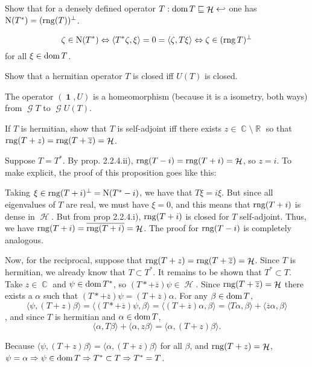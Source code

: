 \documentclass{article}
\theoremstyle{exercisestyle}
\newenvironment{exercise}[1]
  {\renewcommand\theinnerex{#1}\innerex}
  {\endinnerex}
\DeclareMathOperator{\Real}{\mathbb{R}}
\DeclareMathOperator{\Complex}{\mathbb{C}}
\DeclareMathOperator{\hilbert}{\mathcal{H}}
\DeclareMathOperator{\graph}{\mathcal{G}}
\DeclareMathOperator{\Id}{\textbf{1}}
\newcommand{\closure}[1]{\overline{ #1}}
\newcommand{\inner}[2]{\langle #1, #2 \rangle}
\newcommand{\conj}[1]{\overline{#1}}
\begin{document}
\begin{exercise}{2.2.2}
    Show that for a densely defined operator $T : \dom T \sqsubseteq \hilbert \hookleftarrow$ one has $\operatorname{N}(T^*) = (\operatorname{rng} (T))^\perp$.

    $$\zeta \in \kernel (T^*) \Leftrightarrow  \inner{T^* \zeta}{\xi} = 0 = \inner{\zeta}{T \xi} \Leftrightarrow \zeta \in (\rng T)^\perp$$ for all $\xi \in \operatorname{dom} T$.

\end{exercise}

\begin{exercise}{2.2.6}
    Show that a hermitian operator $T$ is closed iff $U (T )$ is closed.

    The operator $(\Id, U)$ is a homeomorphism (because it is a isometry, both ways) from $\graph T$ to $\graph U(T)$.

\end{exercise}

\begin{exercise}{2.2.7}
    If $T$ is hermitian, show that $T$ is self-adjoint iff there exists $z \in \Complex \setminus \Real$ so that $\rng (T + z) = \rng (T + \conj{z}) = \hilbert$.

    Suppose $T = T^*$. By prop. 2.2.4.ii), $\rng (T - i) = \rng (T + i) = \hilbert$, so $z = i$. To make explicit, the proof of this proposition goes like this:

    Taking $\xi \in \operatorname{rng}(T + i)^\perp = \operatorname{N}(T^* - i)$, we have that $T\xi = i\xi$. But since all eigenvalues of $T$ are real, we must have $\xi = 0$,
    and this means that $\operatorname{rng} (T + i)$ is dense in $\hilbert$. But from prop 2.2.4.i), $\operatorname{rng} (T + i)$ is closed for $T$ self-adjoint.
    Thus, we have $\rng (T + i) = \closure{\rng (T + i)} = \hilbert$. The proof for $\operatorname{rng}(T-i)$ is completely analogous.

    Now, for the reciprocal, suppose that $\rng (T + z) = \rng (T + \conj{z}) = \hilbert$. Since $T$ is hermitian, we already know that $T \subset T^*$.
    It remains to be shown that $T^* \subset T$. Take $z \in \Complex$ and $\psi \in \operatorname{dom} T^*$, so $(T* + \conj{z}) \psi \in \hilbert$. Since $\rng (T + \conj{z}) = \hilbert$
    there exists a $\alpha$ such that $(T* + \conj{z}) \psi = (T + \conj{z}) \alpha$. For any $\beta \in \operatorname{dom} T$,
    $$ \inner{\psi}{(T+z)\beta} = \inner{(T*+\conj{z})\psi}{\beta} = \inner{(T+\conj{z})\alpha}{\beta} = \inner{T\alpha}{\beta} + \inner{\conj{z}\alpha}{\beta}$$,
    and since $T$ is hermitian and $\alpha \in \operatorname{dom} T$, $$\inner{\alpha}{T\beta} + \inner{\alpha}{z \beta} = \inner{\alpha}{(T + z) \beta}.$$

    Because $\inner{\psi}{(T + z) \beta} = \inner{\alpha}{(T + z) \beta}$ for all $\beta$, and $\rng(T + z)= \hilbert$, $\psi = \alpha \Rightarrow \psi \in \operatorname{dom} T
        \Rightarrow T^* \subset T \Rightarrow T^* = T$.


\end{exercise}
\end{document}

